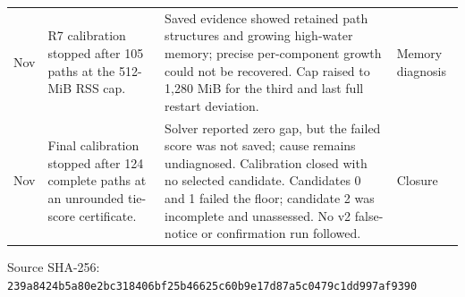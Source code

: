\documentclass[preprint,11pt,authoryear]{elsarticle}
\newif\ifprovenance\provenancetrue
\begin{document}
\begin{longtable}{>{\raggedright\arraybackslash}p{1.1cm}>{\raggedright\arraybackslash}p{4.6cm}>{\raggedright\arraybackslash}p{6.2cm}>{\raggedright\arraybackslash}p{2.7cm}}
12 Nov & R7 calibration stopped after 105 paths at the 512-MiB RSS cap. & Saved evidence showed retained path structures and growing high-water memory; precise per-component growth could not be recovered. Cap raised to 1,280 MiB for the third and last full restart deviation. & Memory diagnosis \\
12 Nov & Final calibration stopped after 124 complete paths at an unrounded tie-score certificate. & Solver reported zero gap, but the failed score was not saved; cause remains undiagnosed. Calibration closed with no selected candidate. Candidates 0 and 1 failed the floor; candidate 2 was incomplete and unassessed. No v2 false-notice or confirmation run followed. & Closure \\
\end{longtable}
\ifprovenance\noindent\scriptsize Source SHA-256: \texttt{239a8424b5a80e2bc318406bf25b46625c60b9e17d87a5c0479c1dd997af9390}\par\fi
\endgroup
\end{document}

